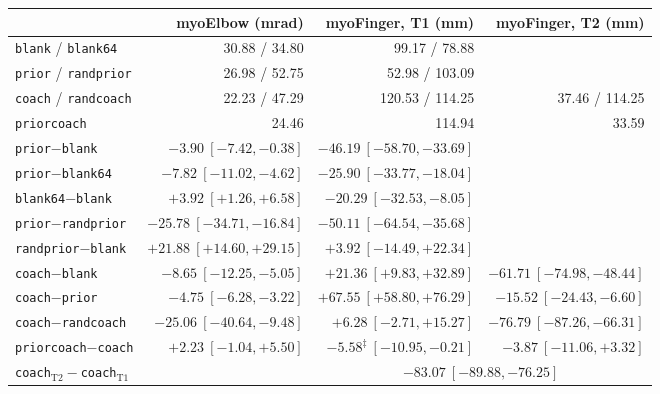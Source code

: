 \begin{tabular}{@{}lrrr@{}}
\toprule
 & myoElbow (mrad) & myoFinger, T1 (mm) & myoFinger, T2 (mm) \\
\midrule
\texttt{blank} / \texttt{blank64}   & 30.88 / 34.80 & 99.17 / 78.88 & \\
\texttt{prior} / \texttt{randprior} & 26.98 / 52.75 & 52.98 / 103.09 & \\
\texttt{coach} / \texttt{randcoach} & 22.23 / 47.29 & 120.53 / 114.25 & 37.46 / 114.25 \\
\texttt{priorcoach}                 & 24.46 & 114.94 & 33.59 \\
\midrule
\texttt{prior}$-$\texttt{blank} & $\mathbf{-3.90}\ [-7.42, -0.38]$ & $\mathbf{-46.19}\ [-58.70, -33.69]$ &  \\
\texttt{prior}$-$\texttt{blank64} & $\mathbf{-7.82}\ [-11.02, -4.62]$ & $\mathbf{-25.90}\ [-33.77, -18.04]$ &  \\
\texttt{blank64}$-$\texttt{blank} & $\mathbf{+3.92}\ [+1.26, +6.58]$ & $\mathbf{-20.29}\ [-32.53, -8.05]$ &  \\
\texttt{prior}$-$\texttt{randprior} & $\mathbf{-25.78}\ [-34.71, -16.84]$ & $\mathbf{-50.11}\ [-64.54, -35.68]$ &  \\
\texttt{randprior}$-$\texttt{blank} & $\mathbf{+21.88}\ [+14.60, +29.15]$ & $+3.92\ [-14.49, +22.34]$ &  \\
\texttt{coach}$-$\texttt{blank} & $\mathbf{-8.65}\ [-12.25, -5.05]$ & $\mathbf{+21.36}\ [+9.83, +32.89]$ & $\mathbf{-61.71}\ [-74.98, -48.44]$ \\
\texttt{coach}$-$\texttt{prior} & $\mathbf{-4.75}\ [-6.28, -3.22]$ & $\mathbf{+67.55}\ [+58.80, +76.29]$ & $\mathbf{-15.52}\ [-24.43, -6.60]$ \\
\texttt{coach}$-$\texttt{randcoach} & $\mathbf{-25.06}\ [-40.64, -9.48]$ & $+6.28\ [-2.71, +15.27]$ & $\mathbf{-76.79}\ [-87.26, -66.31]$ \\
\texttt{priorcoach}$-$\texttt{coach} & $+2.23\ [-1.04, +5.50]$ & $\mathbf{-5.58}^\ddagger\ [-10.95, -0.21]$ & $-3.87\ [-11.06, +3.32]$ \\
\texttt{coach}$_{\mathrm{T2}}-$\texttt{coach}$_{\mathrm{T1}}$ & & \multicolumn{2}{c}{$\mathbf{-83.07}\ [-89.88, -76.25]$} \\
\bottomrule
\end{tabular}
